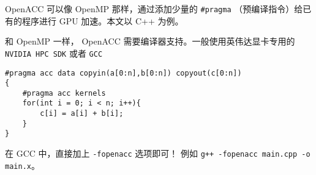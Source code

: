 
\begin{issues}
\issueDraft
\end{issues}

OpenACC 可以像 OpenMP 那样，通过添加少量的 \verb`#pragma` （预编译指令）给已有的程序进行 GPU 加速。本文以 C++ 为例。

和 OpenMP 一样， OpenACC 需要编译器支持。一般使用英伟达显卡专用的 \verb`NVIDIA HPC SDK` 或者 \verb`GCC`

\begin{lstlisting}[language=none]
#pragma acc data copyin(a[0:n],b[0:n]) copyout(c[0:n])
{
    #pragma acc kernels 
    for(int i = 0; i < n; i++){
        c[i] = a[i] + b[i];
    }
}
\end{lstlisting}

在 GCC 中，直接加上 \verb`-fopenacc` 选项即可！ 例如 \verb`g++ -fopenacc main.cpp -o main.x`。
